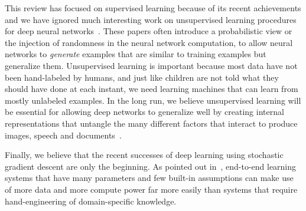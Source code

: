 \documentclass[10pts]{article}
\begin{document}
This review has focused on supervised learning because of its recent
achievements and we have ignored much interesting work on unsupervised
learning procedures for deep neural
networks~\citep{Salakhutdinov2009-small,Hinton95,QuocLe-ICML2012,VincentPLarochelleH2008-small,koray-nips-10,gregor-icml-10,ranzato-pami,Bengio-et-al-ICML-2014,Kingma-et-al-NIPS2014}.
These papers often introduce a probabilistic view or the injection of randomness in the
neural network computation, to allow neural networks to {\em generate} examples that are
similar to training examples but generalize them.
Unsupervised learning is important because most data have not been hand-labeled by humans, and just like
children are not told what they should have done at each instant, we
need learning machines that can learn from mostly unlabeled examples.
In the long run, we believe unsupervised learning will be essential
for allowing deep networks to generalize well by creating internal
representations that untangle the many different factors that interact
to produce images, speech and
documents~\citep{Bengio-Courville-Vincent-TPAMI2013}.


Finally, we believe that the recent successes of deep learning using
stochastic gradient descent are only the beginning.  As pointed out
in~\citet{Bengio+Lecun-chapter2007-small}, end-to-end learning
systems that have many parameters and few built-in assumptions can make use
of more data and more compute power far more easily than systems that
require hand-engineering of domain-specific knowledge.

 





\end{document}
